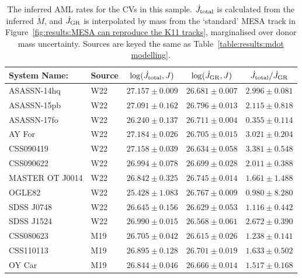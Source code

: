 \begin{table}
    \centering
    \caption{The inferred AML rates for the CVs in this sample. $\dot J_{\rm total}$ is calculated from the inferred $\dot M$, and $\dot J_{\rm GR}$ is interpolated by mass from the `standard' MESA track in Figure~\ref{fig:results:MESA can reproduce the K11 tracks}, marginalised over donor mass uncertainty. Sources are keyed the same as Table~\ref{table:results:mdot modelling}.}
    \label{table:results:Jdot results}
    \begin{tabular}{llccc}
        \hline
        {\bf System Name:} & \textbf{Source}  & \textbf{$\log(\dot J_{\rm total}, J)$} & \textbf{$\log(\dot J_{\rm GR}, J)$} & \textbf{$\dot J_{\rm total} / \dot J_{\rm GR}$} \\
        \hline \hline
        ASASSN-14hq     &  W22      & $27.157 \pm 0.009$    & $26.681 \pm 0.007$    & $2.996 \pm 0.081$ \\
        ASASSN-15pb     &  W22      & $27.091 \pm 0.162$    & $26.796 \pm 0.013$    & $2.115 \pm 0.818$ \\
        ASASSN-17fo     &  W22      & $26.240 \pm 0.137$    & $26.711 \pm 0.004$    & $0.355 \pm 0.114$ \\
        AY For          &  W22      & $27.184 \pm 0.026$    & $26.705 \pm 0.015$    & $3.021 \pm 0.204$ \\
        CSS090419       &  W22      & $27.158 \pm 0.039$    & $26.634 \pm 0.058$    & $3.381 \pm 0.548$ \\
        CSS090622       &  W22      & $26.994 \pm 0.078$    & $26.699 \pm 0.028$    & $2.011 \pm 0.388$ \\
        MASTER OT J0014 &  W22      & $26.842 \pm 0.325$    & $26.745 \pm 0.014$    & $1.661 \pm 1.488$ \\
        OGLE82          &  W22      & $25.428 \pm 1.083$    & $26.767 \pm 0.009$    & $0.980 \pm 8.280$ \\
        SDSS J0748      &  W22      & $26.645 \pm 0.156$    & $26.629 \pm 0.053$    & $1.116 \pm 0.442$ \\
        SDSS J1524      &  W22      & $26.990 \pm 0.015$    & $26.568 \pm 0.061$    & $2.672 \pm 0.390$ \\
        CSS080623       &  M19      & $26.705 \pm 0.042$    & $26.615 \pm 0.026$    & $1.238 \pm 0.141$ \\
        CSS110113       &  M19      & $26.895 \pm 0.128$    & $26.701 \pm 0.019$    & $1.633 \pm 0.502$ \\
        OY Car          &  M19      & $26.844 \pm 0.046$    & $26.666 \pm 0.014$    & $1.517 \pm 0.168$ \\

\end{tabular}
\end{table}
